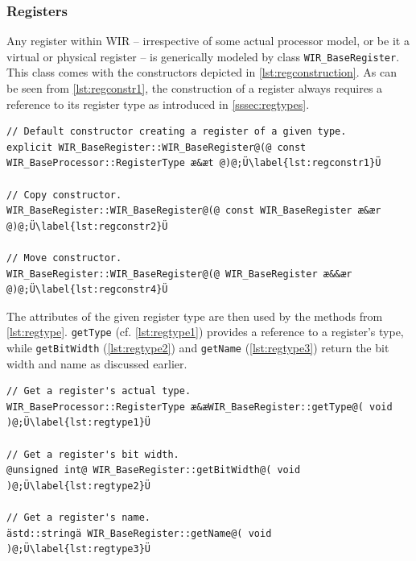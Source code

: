 \subsubsection{Registers}
\label{sssec:regs}

Any register within \gls{WIR} -- irrespective of some actual processor model, or be it a virtual or physical register -- is generically modeled by class \texttt{WIR\_BaseRegister}.
This class comes with the constructors depicted in \cref{lst:regconstruction}.
As can be seen from \cref{lst:regconstr1}, the construction of a register always requires a reference to its register type as introduced in \cref{sssec:regtypes}.

\begin{lstlisting}[style=code,float=ht,caption={Constructors of Class \texttt{WIR\_BaseRegister}},label=lst:regconstruction]
// Default constructor creating a register of a given type.
explicit WIR_BaseRegister::WIR_BaseRegister@(@ const WIR_BaseProcessor::RegisterType æ&æt @)@;Ü\label{lst:regconstr1}Ü

// Copy constructor.
WIR_BaseRegister::WIR_BaseRegister@(@ const WIR_BaseRegister æ&ær @)@;Ü\label{lst:regconstr2}Ü

// Move constructor.
WIR_BaseRegister::WIR_BaseRegister@(@ WIR_BaseRegister æ&&ær @)@;Ü\label{lst:regconstr4}Ü
\end{lstlisting}

The attributes of the given register type are then used by the methods from \cref{lst:regtype}. \texttt{getType} (cf. \cref{lst:regtype1}) provides a reference to a register's type, while \texttt{getBitWidth} (\cref{lst:regtype2}) and \texttt{getName} (\cref{lst:regtype3}) return the bit width and name as discussed earlier.

\begin{lstlisting}[style=code,float=ht,caption={Type and Name Handling of Class \texttt{WIR\_BaseRegister}},label=lst:regtype]
// Get a register's actual type.
WIR_BaseProcessor::RegisterType æ&æWIR_BaseRegister::getType@( void )@;Ü\label{lst:regtype1}Ü

// Get a register's bit width.
@unsigned int@ WIR_BaseRegister::getBitWidth@( void )@;Ü\label{lst:regtype2}Ü

// Get a register's name.
ästd::stringä WIR_BaseRegister::getName@( void )@;Ü\label{lst:regtype3}Ü
\end{lstlisting}

